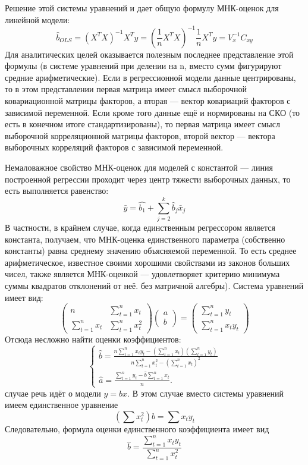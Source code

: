 \documentclass[a4paper, 12pt]{article}
\begin{document}
Решение этой системы уравнений и дает общую формулу МНК-оценок для линейной модели:
\begin{equation*}
\hat{b}_{O L S}=\left(X^{T} X\right)^{-1} X^{T} y=\left(\frac{1}{n} X^{T} X\right)^{-1} \frac{1}{n} X^{T} y=V_{x}^{-1} C_{x y}
\end{equation*}
Для аналитических целей оказывается полезным последнее представление этой формулы (в системе уравнений при делении на n, вместо сумм фигурируют средние арифметические). Если в регрессионной модели данные центрированы, то в этом представлении первая матрица имеет смысл выборочной ковариационной матрицы факторов, а вторая — вектор ковариаций факторов с зависимой переменной. Если кроме того данные ещё и нормированы на СКО (то есть в конечном итоге стандартизированы), то первая матрица имеет смысл выборочной корреляционной матрицы факторов, второй вектор — вектора выборочных корреляций факторов с зависимой переменной.

Немаловажное свойство МНК-оценок для моделей с константой — линия построенной регрессии проходит через центр тяжести выборочных данных, то есть выполняется равенство:
\begin{equation*}
	\bar{y}=\hat{b_{1}}+\sum_{j=2}^{k} \hat{b}_{j} \bar{x}_{j}
\end{equation*}
В частности, в крайнем случае, когда единственным регрессором является константа, получаем, что МНК-оценка единственного параметра (собственно константы) равна среднему значению объясняемой переменной. То есть среднее арифметическое, известное своими хорошими свойствами из законов больших чисел, также является МНК-оценкой — удовлетворяет критерию минимума суммы квадратов отклонений от неё.
без матричной алгебры). Система уравнений имеет вид:
$$
\left(\begin{array}{cc}
	n & \sum_{t=1}^{n} x_{t} \\
	\sum_{t=1}^{n} x_{t} & \sum_{t=1}^{n} x_{t}^{2}
\end{array}\right)\left(\begin{array}{l}
	a \\
	b
\end{array}\right)=\left(\begin{array}{c}
	\sum_{t=1}^{n} y_{t} \\
	\sum_{t=1}^{n} x_{t} y_{t}
\end{array}\right)
$$
Отсюда несложно найти оценки коэффициентов:
$$
\left\{\begin{array}{l}
	\hat{b}=\frac{n \sum_{t=1}^{n} x_{t} y_{t}-\left(\sum_{t=1}^{n} x_{t}\right)\left(\sum_{t=1}^{n} y_{t}\right)}{n \sum_{t=1}^{n} x_{t}^{2}-\left(\sum_{t=1}^{n} x_{t}\right)^{2}} \\
	\hat{a}=\frac{\sum_{t=1}^{n} y_{t}-\hat{b} \sum_{t=1}^{n} x_{t}}{n} .
\end{array}\right.
$$
случае речь идёт о модели $y=b x .$ В этом случае вместо системы уравнений имеем единственное уравнение
$$
\left(\sum x_{t}^{2}\right) b=\sum x_{t} y_{t}
$$
Следовательно, формула оценки единственного коэффициента имеет вид
$$
\hat{b}=\frac{\sum_{t=1}^{n} x_{t} y_{t}}{\sum_{t=1}^{n} x_{t}^{2}}
$$
\end{document}
